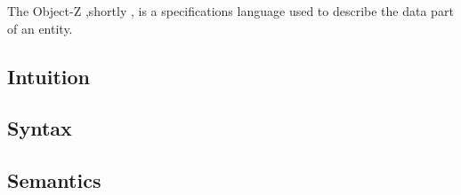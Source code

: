 The Object-Z ,shortly \oz{}, is a specifications language used to describe the data part of an entity.
\subsection{Intuition}
\label{sec_oz_intuition}


\subsection{Syntax}
\label{sec_oz_syntax}


\subsection{Semantics}
\label{sec_oz_sem}


